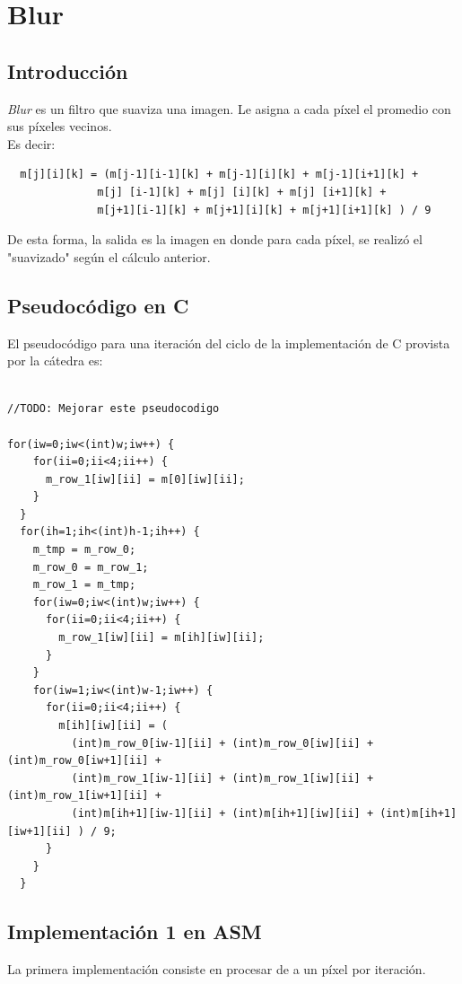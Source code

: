 \section{Blur}
\subsection{Introducción}
\textit{Blur} es un filtro que suaviza una imagen. Le asigna a cada píxel el promedio con sus píxeles vecinos.\\ Es decir:

\begin{verbatim}
  m[j][i][k] = (m[j-1][i-1][k] + m[j-1][i][k] + m[j-1][i+1][k] + 
              m[j] [i-1][k] + m[j] [i][k] + m[j] [i+1][k] + 
              m[j+1][i-1][k] + m[j+1][i][k] + m[j+1][i+1][k] ) / 9
\end{verbatim}

De esta forma, la salida es la imagen en donde para cada píxel, se realizó el "suavizado" según el cálculo anterior.

\subsection{Pseudocódigo en C}

El pseudocódigo para una iteración del ciclo de la implementación de C provista por la cátedra es:

\begin{lstlisting}

//TODO: Mejorar este pseudocodigo

for(iw=0;iw<(int)w;iw++) {
    for(ii=0;ii<4;ii++) {
      m_row_1[iw][ii] = m[0][iw][ii];
    }
  }
  for(ih=1;ih<(int)h-1;ih++) {
    m_tmp = m_row_0;
    m_row_0 = m_row_1;
    m_row_1 = m_tmp;
    for(iw=0;iw<(int)w;iw++) {
      for(ii=0;ii<4;ii++) {
        m_row_1[iw][ii] = m[ih][iw][ii];
      }
    }
    for(iw=1;iw<(int)w-1;iw++) {
      for(ii=0;ii<4;ii++) {
        m[ih][iw][ii] = ( 
          (int)m_row_0[iw-1][ii] + (int)m_row_0[iw][ii] + (int)m_row_0[iw+1][ii] +
          (int)m_row_1[iw-1][ii] + (int)m_row_1[iw][ii] + (int)m_row_1[iw+1][ii] +
          (int)m[ih+1][iw-1][ii] + (int)m[ih+1][iw][ii] + (int)m[ih+1][iw+1][ii] ) / 9;
      }
    }
  }

\end{lstlisting}

\subsection{Implementación 1 en ASM}
La primera implementación consiste en procesar de a un píxel por iteración.\\

